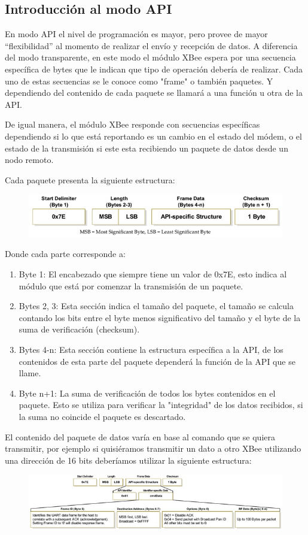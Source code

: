 \documentclass[11pt,oneside,spanish,a4paper]{article}
\begin{document}
\subsection{Introducción al modo API}
En modo API el nivel de programación es mayor, pero provee de mayor
``flexibilidad'' al momento de realizar el envío y recepción de datos.
A diferencia del modo transparente, en este modo el módulo XBee espera
por una secuencia específica de bytes que le indican que tipo de
operación debería de realizar. Cada uno de estas secuencias se le
conoce como "frame" o también paquetes. Y dependiendo del contenido de
cada paquete se llamará a una función u otra de la API.

De igual manera, el módulo XBee responde con secuencias específicas
dependiendo si lo que está reportando es un cambio en el estado del
módem, o el estado de la transmisión si este esta recibiendo un
paquete de datos desde un nodo remoto.

Cada paquete presenta la siguiente estructura:
\begin{figure}[ht]
	\centering
	\includegraphics[width=.6\textwidth]{img/IMAGEN05.jpg}
\end{figure}
Donde cada parte corresponde a:

\begin{enumerate}
\item Byte 1: El encabezado que siempre tiene un valor de 0x7E,
  esto indica al módulo que está por comenzar la transmisión de un
  paquete.
\item Bytes 2, 3: Esta sección indica el tamaño del paquete, el
  tamaño se calcula contando los bits entre el byte menos
  significativo del tamaño y el byte de la suma de verificación
  (checksum).
\item Bytes 4-n: Esta sección contiene la estructura específica a
  la API, de los contenidos de esta parte del paquete dependerá la
  función de la API que se llame.
\item Byte n+1: La suma de verificación de todos los bytes
  contenidos en el paquete. Esto se utiliza para verificar la
  "integridad" de los datos recibidos, si la suma no coincide el
  paquete es descartado.
\end{enumerate}

El contenido del paquete de datos varía en base al comando que se quiera transmitir, por ejemplo si quisiéramos transmitir un dato a otro XBee utilizando una dirección de 16 bits deberíamos utilizar la siguiente estructura:
\begin{figure}[ht]
	\centering
	\includegraphics[width=.6\textwidth]{img/IMAGEN06.jpg}
\end{figure}
\end{document}
